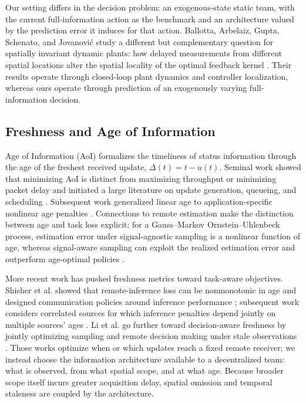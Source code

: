 \documentclass[11pt]{article}
\begin{document}
Our setting differs in the decision problem: an exogenous-state static team,
with the current full-information action as the benchmark and an architecture
valued by the prediction error it induces for that action. 
Ballotta, Arbelaiz, Gupta, Schenato, and Jovanovi\'c study a different but
complementary question for spatially invariant dynamic plants: how delayed
measurements from different spatial locations alter the spatial locality of the
optimal feedback kernel \cite{ballotta2026role}. Their results operate through
closed-loop plant dynamics and controller localization, whereas ours operate
through prediction of an exogenously varying full-information decision.

\subsection{Freshness and Age of Information}
\label{subsec:related_aoi}

Age of Information (AoI) formalizes the timeliness of status information through the age of the freshest received update, $\Delta(t)=t-u(t)$. Seminal work showed that minimizing AoI is distinct from maximizing throughput or minimizing packet delay and initiated a large literature on update generation, queueing, and scheduling \cite{kaul2012realtime,yates2021aoi}. Subsequent work generalized linear age to application-specific nonlinear age penalties \cite{sun2017update}. Connections to remote estimation make the distinction between age and task loss explicit: for a Gauss--Markov Ornstein--Uhlenbeck process, estimation error under signal-agnostic sampling is a nonlinear function of age, whereas signal-aware sampling can exploit the realized estimation error and outperform age-optimal policies \cite{ornee2021ou}.

More recent work has pushed freshness metrics toward task-aware objectives. Shisher et al. showed that remote-inference loss can be nonmonotonic in age and designed communication policies around inference performance \cite{shisher2024timely}; subsequent work considers correlated sources for which inference penalties depend jointly on multiple sources' ages \cite{shisher2026correlated}. Li et al. go further toward decision-aware freshness by jointly optimizing sampling and remote decision making under stale observations \cite{li2026freshness}. Those works optimize when or which updates reach a fixed remote receiver; we instead choose the information architecture available to a decentralized team: what is observed, from what spatial scope, and at what age. Because broader scope itself incurs greater acquisition delay, spatial omission and temporal staleness are coupled by the architecture. 
\end{document}
